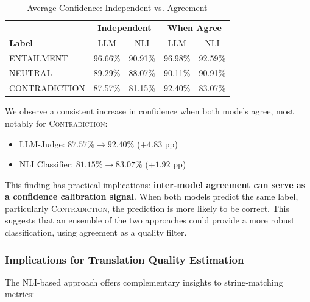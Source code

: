     \begin{table}[htbp]
    \centering
    \caption{Average Confidence: Independent vs. Agreement}
    \label{tab:confidence}
    \begin{tabular}{l|cc|cc}
    \hline
    & \multicolumn{2}{c|}{\textbf{Independent}} & \multicolumn{2}{c}{\textbf{When Agree}} \\
    \textbf{Label} & LLM & NLI & LLM & NLI \\
    \hline
    ENTAILMENT & 96.66\% & 90.91\% & 96.98\% & 92.59\% \\
    NEUTRAL & 89.29\% & 88.07\% & 90.11\% & 90.91\% \\
    CONTRADICTION & 87.57\% & 81.15\% & 92.40\% & 83.07\% \\
    \hline
    \end{tabular}
    \end{table}

    We observe a consistent increase in confidence when both models agree, most notably for \textsc{Contradiction}:

    \begin{itemize}
        \item LLM-Judge: $87.57\% \rightarrow 92.40\%$ ($+4.83$ pp)
        \item NLI Classifier: $81.15\% \rightarrow 83.07\%$ ($+1.92$ pp)
    \end{itemize}

    This finding has practical implications: \textbf{inter-model agreement can serve as a confidence calibration signal}. When both models predict the same label, particularly \textsc{Contradiction}, the prediction is more likely to be correct. This suggests that an ensemble of the two approaches could provide a more robust classification, using agreement as a quality filter.

    \subsubsection{Implications for Translation Quality Estimation}

    The NLI-based approach offers complementary insights to string-matching metrics:

